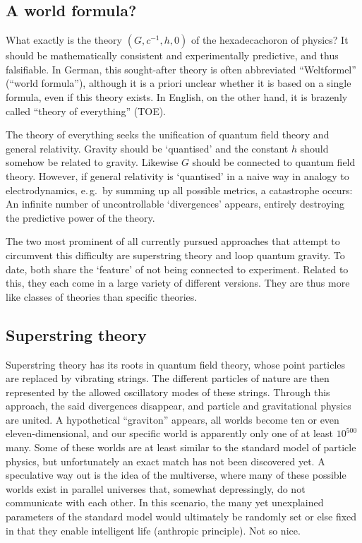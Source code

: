 \documentclass{scrartcl}
\begin{document}
\subsection*{A world formula?}

What exactly is the theory $(G,c^{-1},h,0)$ of the hexadecachoron of physics? It should be mathematically consistent and experimentally predictive, and thus falsifiable. In German, this sought-after theory is often abbreviated \enquote{Weltformel} (\enquote{world formula}), although it is a priori unclear whether it is based on a single formula, even if this theory exists. In English, on the other hand, it is brazenly called \enquote{theory of everything} (TOE).

The theory of everything seeks the unification of quantum field theory and general relativity. Gravity should be \enquote*{quantised} and the constant $h$ should somehow be related to gravity. Likewise $G$ should be connected to quantum field theory. However, if general relativity is \enquote*{quantised} in a naive way in analogy to electrodynamics, e.\,g.\ by summing up all possible metrics, a catastrophe occurs: An infinite number of uncontrollable \enquote*{divergences} appears, entirely destroying the predictive power of the theory.

The two most prominent of all currently pursued approaches that attempt to circumvent this difficulty are superstring theory and loop quantum gravity. To date, both share the \enquote*{feature} of not being connected to experiment. Related to this, they each come in a large variety of different versions. They are thus more like classes of theories than specific theories.


\subsection*{Superstring theory}

Superstring theory has its roots in quantum field theory, whose point particles are replaced by vibrating strings. The different particles of nature are then represented by the allowed oscillatory modes of these strings. Through this approach, the said divergences disappear, and particle and gravitational physics are united. A hypothetical \enquote{graviton} appears, all worlds become ten or even eleven-dimensional, and our specific world is apparently only one of at least $10^{500}$ many. Some of these worlds are at least similar to the standard model of particle physics, but unfortunately an exact match has not been discovered yet. A speculative way out is the idea of the multiverse, where many of these possible worlds exist in parallel universes that, somewhat depressingly, do not communicate with each other. In this scenario, the many yet unexplained parameters of the standard model would ultimately be randomly set or else fixed in that they enable intelligent life (anthropic principle). Not so nice.
\end{document}
